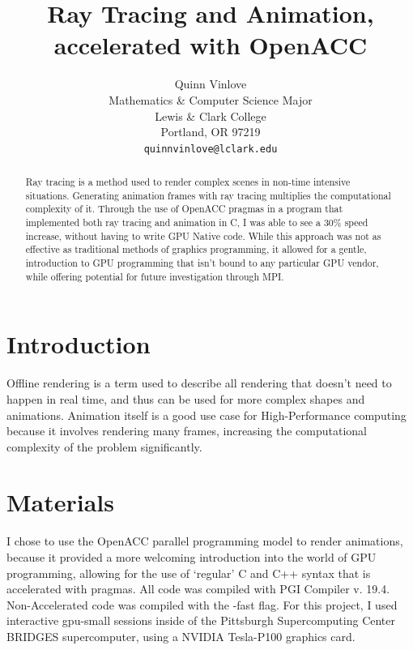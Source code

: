 \documentclass{article}
\title{Ray Tracing and Animation, accelerated with OpenACC}
\author{
  Quinn Vinlove\\%
  Mathematics \& Computer Science Major\\
  Lewis \& Clark College\\
  Portland, OR 97219 \\
  \texttt{quinnvinlove@lclark.edu} \\
}
\begin{document}
\maketitle

\begin{abstract}
Ray tracing is a method used to render complex scenes in non-time intensive situations. Generating animation frames with ray tracing multiplies the computational complexity of it. Through the use of OpenACC pragmas in a program that implemented both ray tracing and animation in C, I was able to see a 30\% speed increase, without having to write GPU Native code. While this approach was not as effective as traditional methods of graphics programming, it allowed for a gentle, introduction to GPU programming that isn’t bound to any particular GPU vendor, while offering potential for future investigation through MPI.
\end{abstract}




\section{Introduction}
Offline rendering is a term used to describe all rendering that doesn’t need to happen in real time, and thus can be used for more complex shapes and animations. Animation itself is a good use case for High-Performance computing because it involves rendering many frames, increasing the computational complexity of the problem significantly. 


\section{Materials}
\label{sec:headings}
I chose to use the OpenACC parallel programming model to render animations, because it provided a more welcoming introduction into the world of GPU programming, allowing for the use of ‘regular’ C and C++ syntax that is accelerated with pragmas. 
All code was compiled with PGI Compiler v. 19.4. Non-Accelerated code was compiled with the -fast flag. For this project, I used interactive gpu-small sessions inside of the Pittsburgh Supercomputing Center BRIDGES supercomputer, using a NVIDIA Tesla-P100 graphics card.
\end{document}
